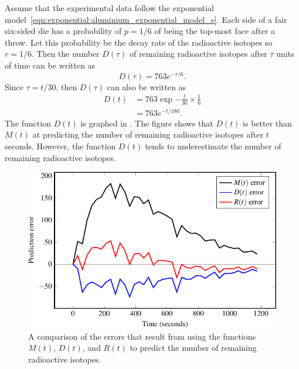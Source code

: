 \documentclass[a4paper,oneside,12pt]{article}
\begin{document}
\begin{problem}
{\begin{solution}
Assume that the experimental data follow the exponential
model~\eqref{eqn:exponential:aluminium_exponential_model_e}.  Each
side of a fair six-sided die has a probability of $p = 1 / 6$ of being
the top-most face after a throw.  Let this probability be the decay
rate of the radioactive isotopes so $r = 1 / 6$.  Then the number
$D(\tau)$ of remaining radioactive isotopes after $\tau$ units of time
can be written as
\[
D(\tau)
=
763 e^{-\tau / 6}.
\]
Since $\tau = t / 30$, then $D(\tau)$ can also be written as
\begin{equation}
\label{eqn:exponential:aluminium_dice_probability}
\begin{aligned}
D(t)
&=
763 \exp{-\frac{t}{30} \times \frac{1}{6}} \\[4pt]
&=
763 e^{-t / 180}.
\end{aligned}
\end{equation}
The function $D(t)$ is graphed in
.  The figure
shows that $D(t)$ is better than $M(t)$ at predicting the number of
remaining radioactive isotopes after $t$ seconds.  However, the
function $D(t)$ tends to underestimate the number of remaining
radioactive isotopes.

\begin{figure}[!htbp]
\centering
\includegraphics[scale=1.1]{image/11/aluminium-error.pdf}
\caption{%
  A comparison of the errors that result from using the functions
  $M(t)$, $D(t)$, and $R(t)$ to predict the number of remaining
  radioactive isotopes.
}
\label{fig:exponential:aluminium_error_analysis}
\end{figure}


\end{solution}}
\end{problem}
\end{document}
